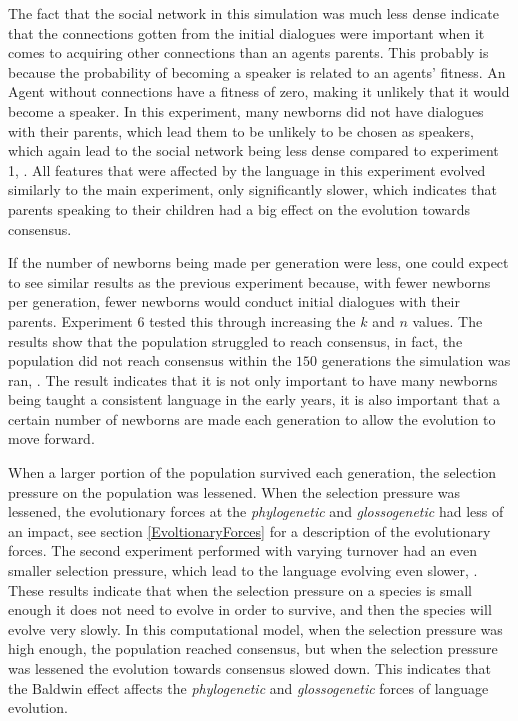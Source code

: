 The fact that the social network in this simulation was much less dense indicate that the connections gotten from the initial dialogues were important when it comes to acquiring other connections than an agents parents. This probably is because the probability of becoming a speaker is related to an agents' fitness. An Agent without connections have a fitness of zero, making it unlikely that it would become a speaker. In this experiment, many newborns did not have dialogues with their parents, which lead them to be unlikely to be chosen as speakers, which again lead to the social network being less dense compared to experiment 1, . All features that were affected by the language in this experiment evolved similarly to the main experiment, only significantly slower, which indicates that parents speaking to their children had a big effect on the evolution towards consensus.

If the number of newborns being made per generation were less, one could expect to see similar results as the previous experiment because, with fewer newborns per generation, fewer newborns would conduct initial dialogues with their parents. Experiment 6 tested this through increasing the $k$ and $n$ values. The results show that the population struggled to reach consensus, in fact, the population did not reach consensus within the $150$ generations the simulation was ran, . The result indicates that it is not only important to have many newborns being taught a consistent language in the early years, it is also important that a certain number of newborns are made each generation to allow the evolution to move forward. 

When a larger portion of the population survived each generation, the selection pressure on the population was lessened. When the selection pressure was lessened, the evolutionary forces at the \textit{phylogenetic} and \textit{glossogenetic} had less of an impact, see section \ref{EvoltionaryForces} for a description of the evolutionary forces. The second experiment performed with varying turnover had an even smaller selection pressure, which lead to the language evolving even slower, . These results indicate that when the selection pressure on a species is small enough it does not need to evolve in order to survive, and then the species will evolve very slowly. In this computational model, when the selection pressure was high enough, the population reached consensus, but when the selection pressure was lessened the evolution towards consensus slowed down. This indicates that the Baldwin effect affects the \textit{phylogenetic} and \textit{glossogenetic} forces of language evolution. 

